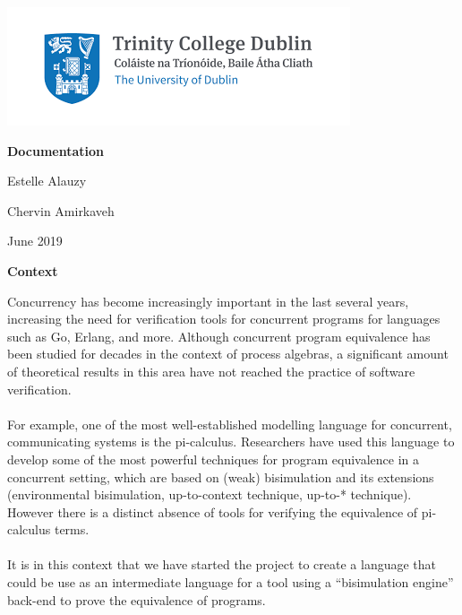 \documentclass[11pt]{report}
\begin{document}
\begin{center}
\includegraphics[scale = 1]{index.png}
\end{center}

\pagestyle{empty}


\centerline{\textbf{\Huge Documentation}}
\bigbreak\bigbreak
\bigbreak\bigbreak

\centerline{ {\Large Estelle Alauzy}}
\centerline{ {\Large  Chervin Amirkaveh}}


 \vfill
\centerline{\large June 2019}







\newpage
\centerline{\textbf{\Huge Context}}
\vspace*{3pt}
\vspace*{20pt}

\tabto{1cm}Concurrency has become increasingly important in the last several years, increasing the need for verification tools for concurrent programs for languages such as Go, Erlang, and more. Although concurrent program equivalence has been studied for decades in the context of process algebras, a significant amount of theoretical results in this area have not reached the practice of software verification. 
\\ \\
\tabto{1cm}For example, one of the most well-established modelling language for concurrent, communicating systems is the pi-calculus. Researchers have used this language to develop some of the
most powerful techniques for program equivalence in a concurrent setting, which are based on (weak) bisimulation and its extensions (environmental bisimulation, up-to-context technique, up-to-* technique). However there is a distinct absence of tools for verifying the equivalence of pi-calculus terms.
\\ \\
\tabto{1cm}It is in this context that we have started the project to create a language that could be use as an intermediate language for a tool using a “bisimulation engine” back-end to prove the equivalence of programs.
\end{document}
